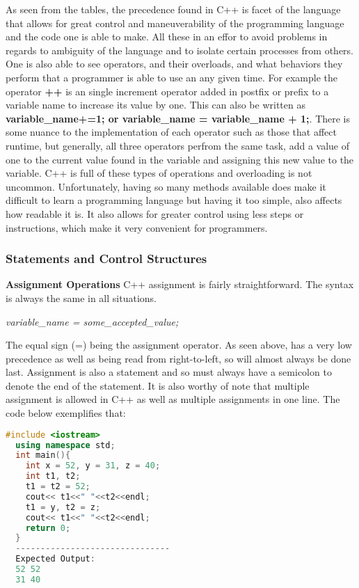 \documentclass[12pt]{article}
\begin{document}
As seen from the tables, the precedence found in C++ is facet of the language that allows for great control and maneuverability of the programming language and the code one is able to make. All these in an effor to avoid problems in regards to ambiguity of the language and to isolate certain processes from others. One is also able to see operators, and their overloads, and what behaviors they perform that a programmer is able to use an any given time. For example the operator \textbf{++} is an single increment operator added in postfix or prefix to a variable name to increase its value by one. This can also be written as \textbf{variable\_name+=1; or variable\_name = variable\_name + 1;}. There is some nuance to the implementation of each operator such as those that affect runtime, but generally, all three operators perfrom the same task, add a value of one to the current value found in the variable and assigning this new value to the variable. C++ is full of these types of operations and overloading is not uncommon. Unfortunately, having so many methods available does make it difficult to learn a programming language but having it too simple, also affects how readable it is. It also allows for greater control using less steps or instructions, which make it very convenient for programmers.

\subsubsection{Statements and Control Structures}

\textbf{Assignment Operations} C++ assignment is fairly straightforward. The syntax is always the same in all situations.
\begin{center}
  \textit{variable\_name = some\_accepted\_value;}
\end{center}
The equal sign (=) being the assignment operator. As seen above, has a very low precedence as well as being read from right-to-left, so will almost always be done last. Assignment is also a statement and so must always have a semicolon to denote the end of the statement. It is also worthy of note that multiple assignment is allowed in C++ as well as multiple assignments in one line. The code below exemplifies that:
\begin{lstlisting}[language=C++]
  #include <iostream>
  using namespace std;
  int main(){
    int x = 52, y = 31, z = 40;
    int t1, t2;
    t1 = t2 = 52;
    cout<< t1<<" "<<t2<<endl;
    t1 = y, t2 = z;
    cout<< t1<<" "<<t2<<endl;
    return 0;
  }
  -------------------------------
  Expected Output:
  52 52
  31 40
\end{lstlisting}
\end{document}
